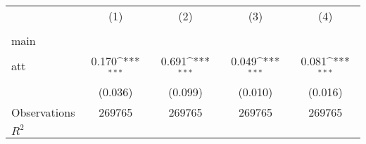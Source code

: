 {
\def\sym#1{\ifmmode^{#1}\else\(^{#1}\)\fi}
\begin{tabular}{l*{4}{c}}
\hline\hline
                    &\multicolumn{1}{c}{(1)}&\multicolumn{1}{c}{(2)}&\multicolumn{1}{c}{(3)}&\multicolumn{1}{c}{(4)}\\
                    &\multicolumn{1}{c}{} &\multicolumn{1}{c}{} &\multicolumn{1}{c}{} &\multicolumn{1}{c}{} \\
\hline
main                &                     &                     &                     &                     \\
att                 &       0.170\sym{***}&       0.691\sym{***}&       0.049\sym{***}&       0.081\sym{***}\\
                    &     (0.036)         &     (0.099)         &     (0.010)         &     (0.016)         \\
\hline
Observations        &      269765         &      269765         &      269765         &      269765         \\
\(R^{2}\)           &                     &                     &                     &                     \\
\hline\hline
\end{tabular}
}
